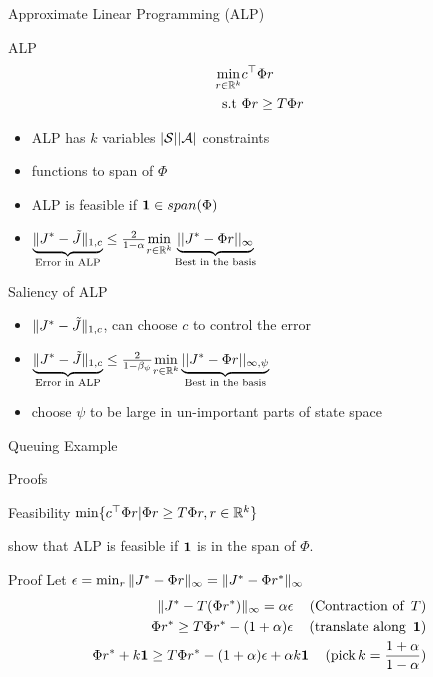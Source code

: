\documentclass[10pt,handout]{beamer}
\begin{document}
\begin{frame}[fragile]{Approximate Linear Programming (ALP)}
\begin{block}{ALP \cite{schweitzer1985generalized,de2003linear}}
\begin{align*}
\min_{r\in \mathbb{R}^k} &c^\top \Phi r\\
\text{s.t}\mbox{ } &\Phi r\geq T \Phi r
\end{align*}
\end{block}

\begin{itemize}
\item ALP has $k$ variables $|\mathcal{S}||\mathcal{A}|$ constraints
\item {\color{orange}{superharmonic}} functions {\color{orange}{restricted}} to span of $\Phi$
\item ALP is feasible if $\mathbf{1} \in span(\Phi)$
\item $\underbrace{\|J^*-\tilde{J}\|_{1,c}}_{\text{Error in ALP}}\leq \frac{2}{1-\alpha}\underset{r\in \mathbb{R}^k}{\min}\underbrace{||J^*-\Phi r||_{\infty}}_{\text{Best in the basis}}$
\end{itemize}
\end{frame}

\begin{frame}[fragile]{Saliency of ALP}
\begin{itemize}
\item $\|J^*-\tilde{J}\|_{1,c}$, can choose $c$ to control the error
\item $\underbrace{\|J^*-\tilde{J}\|_{1,c}}_{\text{Error in ALP}}\leq \frac{2}{1-\beta_\psi}\underset{r\in \mathbb{R}^k}{\min}\underbrace{||J^*-\Phi r||_{\infty,\psi}}_{\text{Best in the basis}}$
\item \cite{de2003linear,de2004constraint} choose $\psi$ to be large in un-important parts of state space
\end{itemize}
\begin{block}{Queuing Example}

\end{block}

\end{frame}

\begin{frame}[fragile]{Proofs}
\begin{block}{Feasibility}
$\min\{ c^\top \Phi r | \Phi r\geq T \Phi r, r\in \mathbb{R}^k\}$
\end{block}
\cite{de2003linear} show that ALP is feasible if $\mathbf{1}$ is in the span of $\Phi$.
\begin{block}{Proof}
Let $\epsilon=\min_r \|J^*-\Phi r\|_\infty=\|J^*-\Phi r^*\|_\infty$
\begin{align*}
\|J^*-T (\Phi r^*)\|_\infty=\alpha \epsilon\,\quad(\text{Contraction~of~}\,T)\\
\Phi r^* \geq T \Phi r^* -(1+\alpha)\epsilon\,\quad(\text{translate~along~}\,\mathbf{1})\\
\Phi r^* + k\mathbf{1}\geq T \Phi r^* -(1+\alpha)\epsilon +\alpha k\mathbf{1}\,\quad(\text{pick}\,k=\frac{1+\alpha}{1-\alpha})\\
\end{align*}
\end{block}
\end{frame}
\end{document}
